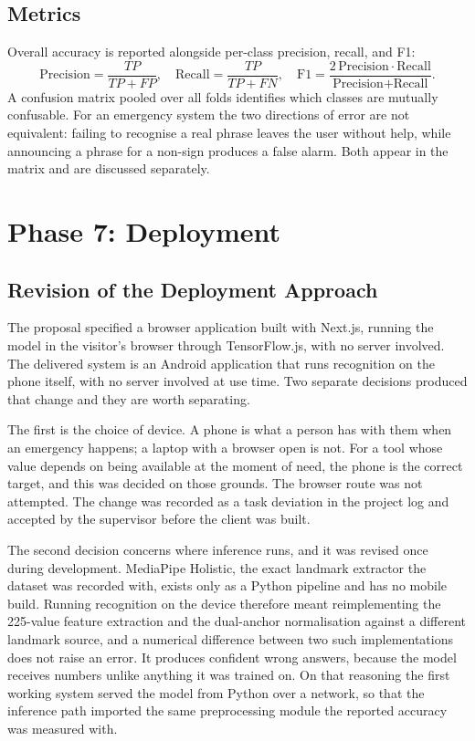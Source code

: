 \subsection{Metrics}

Overall accuracy is reported alongside per-class precision, recall, and F1:
\begin{equation}
    \text{Precision} = \frac{TP}{TP+FP}, \quad
    \text{Recall} = \frac{TP}{TP+FN}, \quad
    \text{F1} = \frac{2\,\text{Precision}\cdot\text{Recall}}{\text{Precision}+\text{Recall}}.
\end{equation}
A confusion matrix pooled over all folds identifies which classes are mutually confusable. For an emergency system the two directions of error are not equivalent: failing to recognise a real phrase leaves the user without help, while announcing a phrase for a non-sign produces a false alarm. Both appear in the matrix and are discussed separately.

\section{Phase 7: Deployment}

\subsection{Revision of the Deployment Approach}
\label{sec:deploychange}

The proposal specified a browser application built with Next.js, running the model in the visitor's browser through TensorFlow.js, with no server involved. The delivered system is an Android application that runs recognition on the phone itself, with no server involved at use time. Two separate decisions produced that change and they are worth separating.

The first is the choice of device. A phone is what a person has with them when an emergency happens; a laptop with a browser open is not. For a tool whose value depends on being available at the moment of need, the phone is the correct target, and this was decided on those grounds. The browser route was not attempted. The change was recorded as a task deviation in the project log and accepted by the supervisor before the client was built.

The second decision concerns where inference runs, and it was revised once during development. MediaPipe Holistic, the exact landmark extractor the dataset was recorded with, exists only as a Python pipeline and has no mobile build. Running recognition on the device therefore meant reimplementing the 225-value feature extraction and the dual-anchor normalisation against a different landmark source, and a numerical difference between two such implementations does not raise an error. It produces confident wrong answers, because the model receives numbers unlike anything it was trained on. On that reasoning the first working system served the model from Python over a network, so that the inference path imported the same preprocessing module the reported accuracy was measured with.

